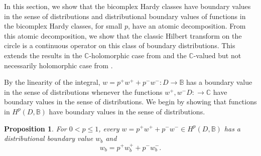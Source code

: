 \documentclass[suppldata]{interact}
\theoremstyle{plain}%
\newtheorem{prop}[theorem]{Proposition}
\theoremstyle{definition}
\theoremstyle{remark}
\newcommand{\bc}{\mathbb{B}}
\newcommand{\hpb}{H^p(D,\bc)}
\begin{document}
In this section, we show that the bicomplex Hardy classes have boundary values in the sense of distributions and distributional boundary values of functions in the bicomplex Hardy classes, for small $p$, have an atomic decomposition. From this atomic decomposition, we show that the classic Hilbert transform on the circle is a continuous operator on this class of boundary distributions. This extends the results in the $\mathbb{C}$-holomorphic case from \cite{GHJH2} and the $\mathbb{C}$-valued but not necessarily holomorphic  case from \cite{WB}.



    By the linearity of the integral, $w = p^+ w^+ + p^- w^- : D \to \bc$ has a boundary value in the sense of distributions whenever the functions $w^+,w^- D: \to \mathbb{C}$ have boundary values in the sense of distributions. We begin by showing that functions in $\hpb$ have boundary values in the sense of distributions.


\begin{prop}\label{Prop: bcholodistbv}
    For $0 < p \leq 1$, every $w = p^+ w^+ + p^- w^-\in \hpb$ has a distributional boundary value $w_b$ and 
    \[
        w_b = p^+ w^+_b + p^- w^-_b.
    \]  
\end{prop}
\end{document}
